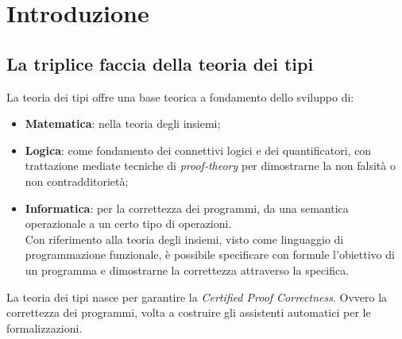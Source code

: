 \chapter{Introduzione}
\label{cap:introduzione}
\section{La triplice faccia della teoria dei tipi}
\label{sec:la-triplice-faccia}
La teoria dei tipi offre una base teorica a fondamento dello sviluppo di:
\begin{itemize}
\item \textbf{Matematica}: nella teoria degli insiemi;
\item \textbf{Logica}: come fondamento dei connettivi logici e dei quantificatori, con trattazione mediate tecniche di \textit{proof-theory} per dimostrarne la non falsit\`a o non contradditoriet\`a;
\item \textbf{Informatica}: per la correttezza dei programmi, da una semantica operazionale a un certo tipo di operazioni.\\ 
Con riferimento alla teoria degli insiemi, visto come linguaggio di programmazione funzionale, \`e possibile specificare con formule l'obiettivo di un programma e dimostrarne la correttezza attraverso la specifica.
\end{itemize}
\noindent
La teoria dei tipi nasce per garantire la \textit{Certified Proof Correctness}. Ovvero la correttezza dei programmi, volta a costruire gli assistenti automatici per le formalizzazioni.

